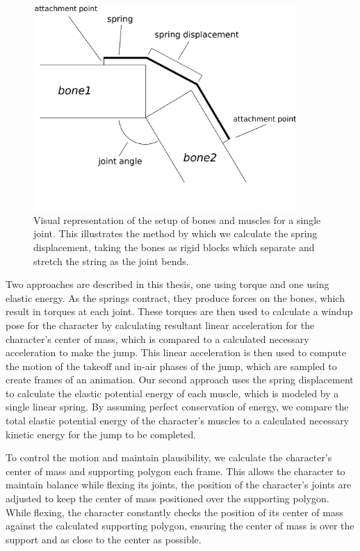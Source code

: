 \begin{figure}[ht]
	\centering
	\includegraphics[width=10cm]{images/spring_calc/spring_angle_calc.eps}
	\caption[Diagram of muscle setup]{Visual representation of the setup of bones and muscles for a single joint.  This illustrates the method by which we calculate the spring displacement, taking the bones as rigid blocks which separate and stretch the string as the joint bends.}
	\label{fig:forceCalc}
\end{figure}

Two approaches are described in this thesis, one using torque and one using elastic energy.  As the springs contract, they produce forces on the bones, which result in torques at each joint.  These torques are then used to calculate a windup pose for the character by calculating resultant linear acceleration for the character's center of mass, which is compared to a calculated necessary acceleration to make the jump.  This linear acceleration is then used to compute the motion of the takeoff and in-air phases of the jump, which are sampled to create frames of an animation.  Our second approach uses the spring displacement to calculate the elastic potential energy of each muscle, which is modeled by a single linear spring.  By assuming perfect conservation of energy, we compare the total elastic potential energy of the character's muscles to a calculated necessary kinetic energy for the jump to be completed.

To control the motion and maintain plausibility, we calculate the character's center of mass and supporting polygon each frame.  This allows the character to maintain balance while flexing its joints, the position of the character's joints are adjusted to keep the center of mass positioned over the supporting polygon.  While flexing, the character constantly checks the position of its center of mass against the calculated supporting polygon, ensuring the center of mass is over the support and as close to the center as possible.

